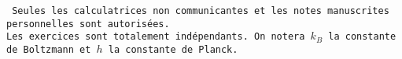 \texttt{
Seules les calculatrices non communicantes et les notes manuscrites personnelles sont autorisées.\\
Les exercices sont totalement indépendants. On notera $k_B$ la constante de Boltzmann et $h$ la constante de Planck.
}
